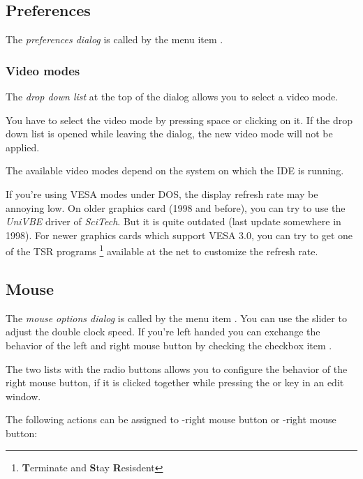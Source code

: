 \subsection{Preferences}
The \emph{preferences dialog} is called by the menu item
.


\subsubsection{Video modes}
The \emph{drop down list} at the top of the dialog allows you
to select a video mode.

\begin{remark}
You have to select the video mode by pressing space or clicking
on it. If the drop down list is opened while leaving the dialog,
the new video mode will not be applied.
\end{remark}

The available video modes depend on the system on which the IDE
is running. 

\begin{remark}
If you're using VESA modes under DOS, the display refresh rate may be
annoying low. On older graphics card (1998 and before),
you can try to use the \emph{UniVBE} driver of \emph{SciTech}. But
it is quite outdated (last update somewhere in 1998). For newer
graphics cards which support VESA 3.0, you can try to get one
of the TSR programs
\footnote{\textbf{T}erminate and \textbf{S}tay \textbf{R}esisdent}
available at the net to customize the refresh rate.
\end{remark}

\subsection{Mouse}
\label{se:prefmouse}
The \emph{mouse options dialog} is called by the menu item
. You can use the slider to adjust the
double clock speed. If you're left handed you can exchange the
behavior of the left and right mouse button by checking the checkbox
item .

The two lists with the radio buttons allows you
to configure the behavior of the
right mouse button, if it is clicked together while
pressing the  or
 key in an edit window.

The following actions can be assigned to -right mouse button or
-right mouse button:

